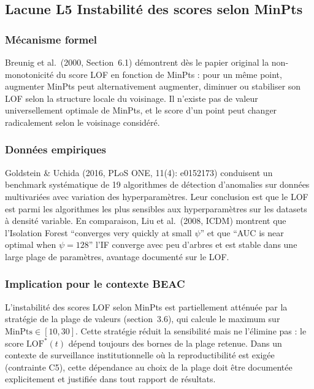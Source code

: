 \documentclass[12pt,a4paper]{article}
\begin{document}
\subsection{Lacune L5  Instabilité des scores selon MinPts}

\subsubsection{Mécanisme formel}

Breunig et al.\ (2000, Section~6.1) démontrent dès le papier original la
non-monotonicité du score LOF en fonction de MinPts : pour un même point,
augmenter MinPts peut alternativement augmenter, diminuer ou stabiliser son
LOF selon la structure locale du voisinage. Il n'existe pas de valeur
universellement optimale de MinPts, et le score d'un point peut changer
radicalement selon le voisinage considéré.

\subsubsection{Données empiriques}

Goldstein \& Uchida (2016, PLoS ONE, 11(4): e0152173) conduisent un benchmark
systématique de 19 algorithmes de détection d'anomalies sur données
multivariées avec variation des hyperparamètres. Leur conclusion est que le
LOF est parmi les algorithmes les plus sensibles aux hyperparamètres sur les
datasets à densité variable. En comparaison, Liu et al.\ (2008, ICDM) montrent
que l'Isolation Forest ``converges very quickly at small $\psi$'' et que
``AUC is near optimal when $\psi = 128$''  l'IF converge avec peu d'arbres
et est stable dans une large plage de paramètres, avantage documenté sur le LOF.

\subsubsection{Implication pour le contexte BEAC}

L'instabilité des scores LOF selon MinPts est partiellement atténuée par la
stratégie de la plage de valeurs (section~3.6), qui calcule le maximum sur
$\mathrm{MinPts} \in [10, 30]$. Cette stratégie réduit la sensibilité mais
ne l'élimine pas : le score $\mathrm{LOF}^*(t)$ dépend toujours des bornes
de la plage retenue. Dans un contexte de surveillance institutionnelle où la
reproductibilité est exigée (contrainte C5), cette dépendance au choix de la
plage doit être documentée explicitement et justifiée dans tout rapport de
résultats.
\end{document}
